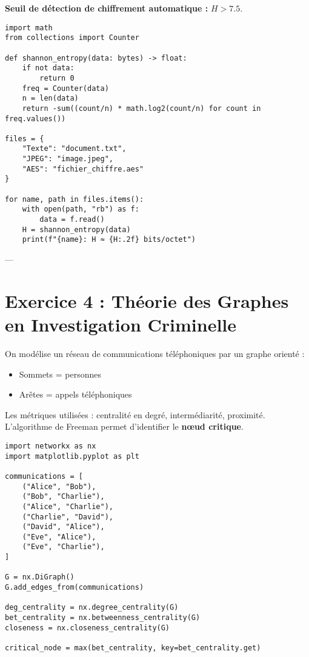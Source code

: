 \documentclass[memoire, 12pt]{report}
\begin{document}
\begin{titlepage}
\textbf{Seuil de détection de chiffrement automatique :} $H > 7.5$.

\begin{lstlisting}[style=python, caption={Calcul d’entropie de Shannon en Python}]
import math
from collections import Counter

def shannon_entropy(data: bytes) -> float:
    if not data:
        return 0
    freq = Counter(data)
    n = len(data)
    return -sum((count/n) * math.log2(count/n) for count in freq.values())

files = {
    "Texte": "document.txt",
    "JPEG": "image.jpeg",
    "AES": "fichier_chiffre.aes"
}

for name, path in files.items():
    with open(path, "rb") as f:
        data = f.read()
    H = shannon_entropy(data)
    print(f"{name}: H ≈ {H:.2f} bits/octet")
\end{lstlisting}

---

\section*{Exercice 4 : Théorie des Graphes en Investigation Criminelle}

On modélise un réseau de communications téléphoniques par un graphe orienté :  
\begin{itemize}
    \item Sommets = personnes
    \item Arêtes = appels téléphoniques
\end{itemize}

Les métriques utilisées : centralité en degré, intermédiarité, proximité.  
L’algorithme de Freeman permet d’identifier le \textbf{nœud critique}.

\begin{lstlisting}[style=python, caption={Analyse de graphes en Python avec NetworkX}]
import networkx as nx
import matplotlib.pyplot as plt

communications = [
    ("Alice", "Bob"),
    ("Bob", "Charlie"),
    ("Alice", "Charlie"),
    ("Charlie", "David"),
    ("David", "Alice"),
    ("Eve", "Alice"),
    ("Eve", "Charlie"),
]

G = nx.DiGraph()
G.add_edges_from(communications)

deg_centrality = nx.degree_centrality(G)
bet_centrality = nx.betweenness_centrality(G)
closeness = nx.closeness_centrality(G)

critical_node = max(bet_centrality, key=bet_centrality.get)


\end{lstlisting}
\end{titlepage}
\end{document}

